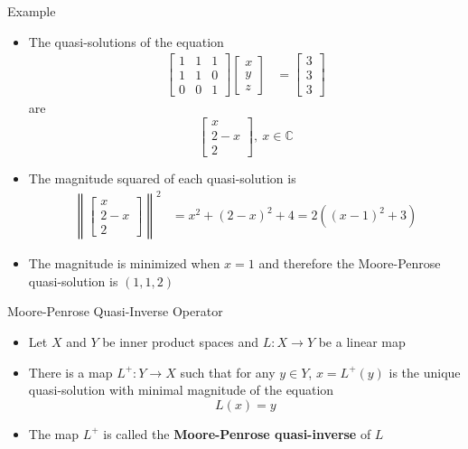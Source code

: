 \documentclass[usenames,dvipsnames,10pt]{beamer}
\newcommand\C{\mathbb{C}}
\begin{document}
\begin{frame}
  {Example}

  \begin{itemize}
  \item The quasi-solutions of the equation
    \begin{align*}
      \begin{bmatrix} 1 & 1 & 1 \\ 1 & 1 & 0 \\ 0 & 0 & 1\end{bmatrix}\begin{bmatrix} x \\ y \\ z \end{bmatrix} &= \begin{bmatrix} 3 \\ 3 \\ 3 \end{bmatrix}
    \end{align*}
    are
    \[
      \begin{bmatrix} x \\ 2-x \\ 2 \end{bmatrix},\ x \in \C
    \]
  \item The magnitude squared of each quasi-solution is
    \begin{align*}
      \left\|\begin{bmatrix} x \\ 2-x \\ 2 \end{bmatrix}\right\|^2
      &= x^2 + (2-x)^2 + 4
        = 2((x-1)^2 + 3)
    \end{align*}
  \item The magnitude is minimized when $x = 1$ and therefore the Moore-Penrose quasi-solution is
    $(1, 1, 2)$
  \end{itemize}
\end{frame}

\begin{frame}
  {Moore-Penrose Quasi-Inverse Operator}

  \begin{itemize}
  \item Let $X$ and $Y$ be inner product spaces and $L: X \rightarrow Y$ be a linear map
  \item There is a map $L^+: Y \rightarrow X$ such that for any $y \in Y$, $x = L^+(y)$ is the unique quasi-solution with minimal magnitude of the equation
    \[
      L(x) = y
    \]
  \item The map $L^+$ is called the {\bf Moore-Penrose quasi-inverse} of $L$
  \end{itemize}
\end{frame}
\end{document}
